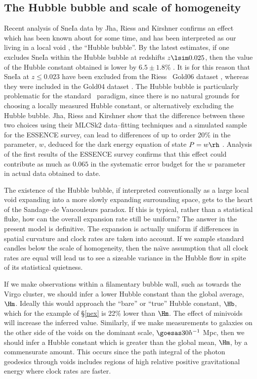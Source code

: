 \documentclass[12pt]{iopart}
\begin{document}
\subsection{The Hubble bubble and scale of homogeneity\label{bubble}}

Recent analysis of SneIa data by Jha, Riess and Kirshner \cite{JRK} confirms
an effect which has been known about for some time, and has been interpreted
as our living in a local void \cite{Tom1}, the ``Hubble bubble''. By the
latest estimates, if one excludes SneIa within the Hubble bubble at redshifts
$z\lsim0.025$, then the value of the Hubble constant obtained is lower by
$6.5\pm1.8$\% \cite{JRK}. It is for this reason that SneIa at $z\le0.023$ have
been excluded from the Riess \etal\ Gold06 dataset \cite{Riess06}, whereas
they were included in the Gold04 dataset \cite{Riess04}. The Hubble bubble
is particularly problematic for the standard \LCDM\ paradigm, since there is
no natural grounds for choosing a locally measured Hubble constant,
or alternatively excluding the Hubble bubble. Jha, Riess and Kirshner show
that the difference between these two choices using their MLCSk2 data--fitting
techniques and a simulated sample for the ESSENCE survey, can lead to
differences of up to order 20\% in the parameter, $w$, deduced for the
dark energy equation of state $P=w\rh$ \cite{JRK}. Analysis of the first
results of the ESSENCE survey \cite{essence} confirms that this effect could
contribute as much as $0.065$ in the systematic error budget for the $w$
parameter in actual data obtained to date.

The existence of the Hubble bubble, if interpreted conventionally as a large
local void expanding into a more slowly expanding surrounding space, gets
to the heart of the Sandage--de Vaucouleurs paradox. If this is typical, rather
than a statistical fluke, how can the overall expansion rate still be uniform?
The answer in the present model is definitive. The expansion is actually
uniform if differences in spatial curvature and clock rates are taken into
account. If we sample standard candles below the scale of homogeneity, then
the na\"{\i}ve assumption that all clock rates are equal will lead us to
see a sizeable variance in the Hubble flow in spite of its statistical
quietness.

If we make observations within a filamentary bubble wall, such as towards
the Virgo cluster, we should infer a lower Hubble constant than the global
average, $\Hm$. Ideally this would approach the ``bare'' or ``true'' Hubble
constant, $\Hb$, which for the example of \S\ref{nex} is 22\% lower than
$\Hm$. The effect of minivoids will increase the
inferred value. Similarly, if we make measurements to galaxies
on the other side of the voids on the dominant scale, $\goesas30h^{-1}$ Mpc,
then we should infer a Hubble constant which is greater than the global
mean, $\Hm$, by a commensurate amount. This occurs since the path integral
of the photon geodesics through voids includes regions of high relative
positive gravitational energy where clock rates are faster.
\end{document}
